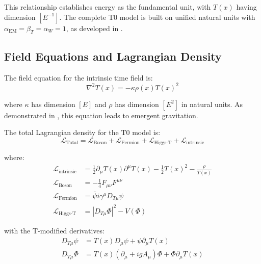 \documentclass[12pt,a4paper]{article}
\begin{document}
	This relationship establishes energy as the fundamental unit, with $T(x)$ having dimension $[E^{-1}]$. The complete T0 model is built on unified natural units with $\alpha_{\text{EM}} = \beta_T = \alpha_W = 1$, as developed in \cite{Pascher2025Alpha1Beta1}.
	
	\subsection{Field Equations and Lagrangian Density}
	\label{subsec:field_equations}
	
	The field equation for the intrinsic time field is:
	\begin{equation}
		\nabla^2 T(x) = -\kappa\rho(x)T(x)^2
		\label{eq:field_equation}
	\end{equation}
	
	where $\kappa$ has dimension $[E]$ and $\rho$ has dimension $[E^2]$ in natural units. As demonstrated in \cite{Pascher2025EmergentGrav}, this equation leads to emergent gravitation.
	
	The total Lagrangian density for the T0 model is:
	\begin{equation}
		\mathcal{L}_{\text{Total}} = \mathcal{L}_{\text{Boson}} + \mathcal{L}_{\text{Fermion}} + \mathcal{L}_{\text{Higgs-T}} + \mathcal{L}_{\text{intrinsic}}
		\label{eq:total_lagrangian}
	\end{equation}
	
	where:
	\begin{align}
		\mathcal{L}_{\text{intrinsic}} &= \frac{1}{2}\partial_{\mu}T(x)\partial^{\mu}T(x) - \frac{1}{2}T(x)^2 - \frac{\rho}{T(x)} \label{eq:intrinsic_lagrangian} \\
		\mathcal{L}_{\text{Boson}} &= -\frac{1}{4}F_{\mu\nu}F^{\mu\nu} \label{eq:boson_lagrangian} \\
		\mathcal{L}_{\text{Fermion}} &= \bar{\psi}i\gamma^{\mu}D_{T\mu}\psi \label{eq:fermion_lagrangian} \\
		\mathcal{L}_{\text{Higgs-T}} &= |D_{T\mu}\Phi|^2 - V(\Phi) \label{eq:higgs_lagrangian}
	\end{align}
	
	with the T-modified derivatives:
	\begin{align}
		D_{T\mu}\psi &= T(x)D_{\mu}\psi + \psi\partial_{\mu}T(x) \label{eq:t_modified_derivative} \\
		D_{T\mu}\Phi &= T(x)(\partial_{\mu} + igA_{\mu})\Phi + \Phi\partial_{\mu}T(x) \label{eq:higgs_t_derivative}
	\end{align}
	
\end{document}
